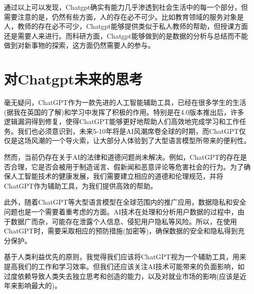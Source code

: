 \documentclass[a4paper]{article}
\begin{document}
通过以上可以发现，Chatgpt确实有能力几乎渗透到社会生活中的每一个部分，但需要注意的是，仍然有些方面，人的存在必不可少。比如教育领域的服务对象是人，教师的存在必不可少，Chatgpt能够提供类似于私人教师的帮助，但授课方面还是需要人来进行。而科研方面，Chatgpt能够做到的是数据的分析与总结而不能做到对新事物的探索，这方面仍然需要人的参与。

\section{对Chatgpt未来的思考}

毫无疑问，ChatGPT作为一款先进的人工智能辅助工具，已经在很多学生的生活(据我在英国的了解)和学习中发挥了积极的作用。特别是在4.0版本推出后，许多逻辑漏洞得到修复，使得ChatGPT能够更好地帮助人们高效地完成学习和工作任务。我们也必须意识到，未来5-10年将是AI风潮席卷全球的时期，而ChatGPT仅仅是这场风潮的一个导火索，让大部分人体验到了大型语言模型所带来的便利性。

然而，当前仍存在关于AI的法律和道德问题尚未解决。例如，ChatGPT的存在是否合理，它是否会被用于制造谣言、假新闻和恶意评论等危害社会的行为。为了确保人工智能技术的健康发展，我们需要建立相应的道德和伦理规范，并将ChatGPT作为辅助工具，为我们提供高效的帮助。

此外，随着ChatGPT等大型语言模型在全球范围内的推广应用，数据隐私和安全问题也是一个需要着重考虑的方面。AI技术在处理和分析用户数据的过程中，由于数据广而杂，可能存在泄露个人信息、侵犯用户隐私等风险。所以，在使用ChatGPT时，需要采取相应的预防措施(加密等)，确保数据的安全和隐私得到充分保护。

基于人类利益优先的原则，我觉得我们应该将ChatGPT视为一个辅助工具，用来提高我们的工作和学习效率。但我们还应该关注AI技术可能带来的负面影响，如过度依赖导致人类失去独立思考和创造的能力，以及对就业市场的影响(应该是近年来影响最大的)。
\end{document}
